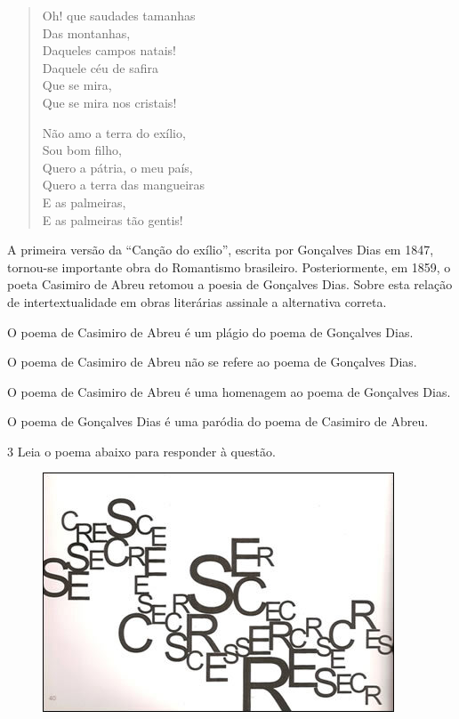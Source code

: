 \begin{myquote}
\begin{verse}
Oh! que saudades tamanhas \\
\qquad Das montanhas, \\
Daqueles campos natais! \\
Daquele céu de safira \\
\qquad Que se mira, \\
Que se mira nos cristais!

Não amo a terra do exílio, \\
\qquad Sou bom filho, \\
Quero a pátria, o meu país, \\
Quero a terra das mangueiras \\
\qquad E as palmeiras, \\
E as palmeiras tão gentis! 

\end{verse}


\end{myquote}

A primeira versão da ``Canção do exílio'', escrita por Gonçalves Dias em 1847,
tornou-se importante obra do Romantismo brasileiro. Posteriormente, em 1859, o
poeta Casimiro de Abreu retomou a poesia de Gonçalves Dias. Sobre esta relação
de intertextualidade em obras literárias assinale a alternativa correta.

\begin{escolha}

  \item O poema de Casimiro de Abreu é um plágio do poema de Gonçalves Dias.

  \item O poema de Casimiro de Abreu não se refere ao poema de Gonçalves Dias.

  \item O poema de Casimiro de Abreu é uma homenagem ao poema de Gonçalves Dias.

  \item O poema de Gonçalves Dias é uma paródia do poema de Casimiro de Abreu.

\end{escolha}

\num{3} Leia o poema abaixo para responder à questão.

\begin{figure}
\centering
\includegraphics[width=4.11458in,height=2.80208in]{./imgSAEB_7_POR/media/image3.png}
\end{figure}

